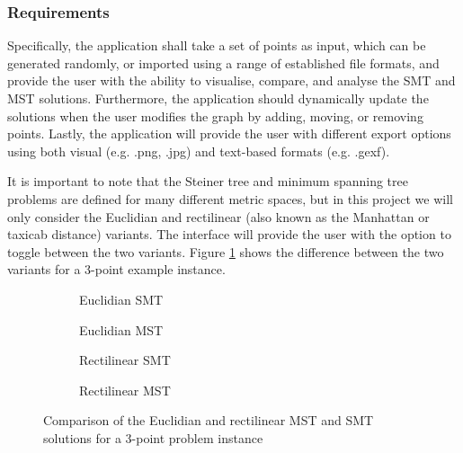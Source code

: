 \documentclass{l4proj}
\begin{document}
\subsubsection{Requirements}
Specifically, the application shall take a set of points as input, which can be generated randomly, or imported using a range of established file formats, and provide the user with the ability to visualise, compare, and analyse the SMT and MST solutions.
Furthermore, the application should dynamically update the solutions when the user modifies the graph by adding, moving, or removing points.
Lastly, the application will provide the user with different export options using both visual (e.g. .png, .jpg) and text-based formats (e.g. .gexf).

It is important to note that the Steiner tree and minimum spanning tree problems are defined for many different metric spaces, but in this project we will only consider the Euclidian and rectilinear (also known as the Manhattan or taxicab distance) variants. The interface will provide the user with the option to toggle between the two variants. Figure \ref{fig:mst_rmst_3point} shows the difference between the two variants for a 3-point example instance.

\begin{figure}[htb]
    \begin{subfigure}[b]{0.24\textwidth}
        \centering
        
        \caption{Euclidian SMT}
    \end{subfigure}
    \begin{subfigure}[b]{0.24\textwidth}
        \centering
        
        \caption{Euclidian MST}
    \end{subfigure}
    \begin{subfigure}[b]{0.24\textwidth}
        \centering
        
        \caption{Rectilinear SMT}
    \end{subfigure}
    \begin{subfigure}[b]{0.24\textwidth}
        \centering
        
        \caption{Rectilinear MST}
    \end{subfigure}

    \caption{Comparison of the Euclidian and rectilinear MST and SMT solutions for a 3-point problem instance}
    \label{fig:mst_rmst_3point}
\end{figure}
\end{document}
